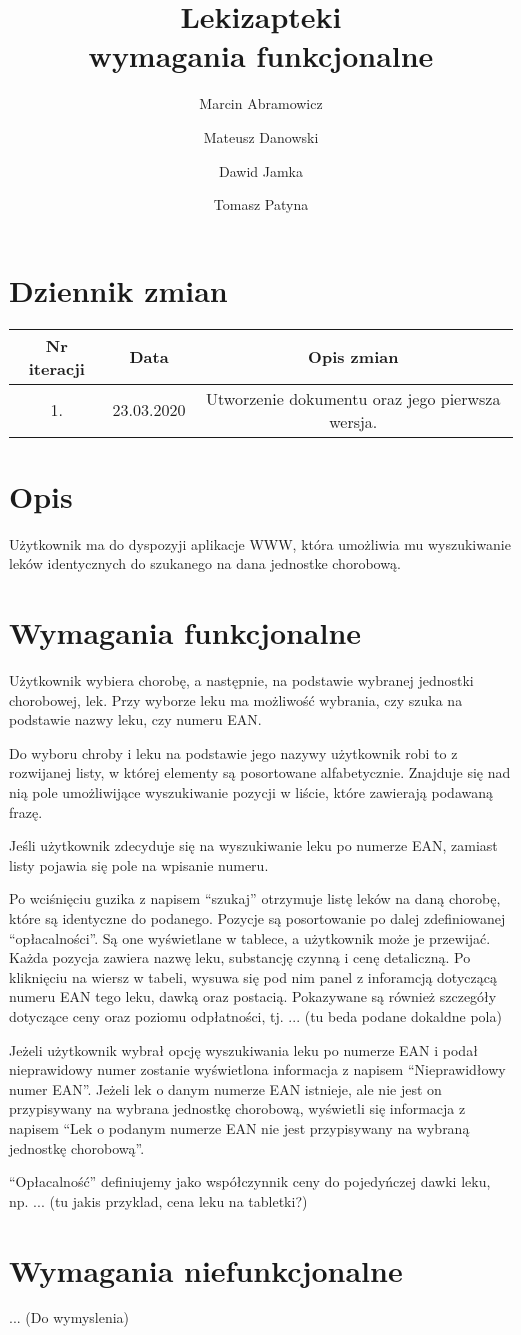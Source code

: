 \documentclass{article}
\title{
Lekizapteki\\
\large wymagania funkcjonalne}
\author{Marcin Abramowicz \and Mateusz Danowski \and Dawid Jamka \and Tomasz Patyna}
\begin{document}
  \maketitle

  \section{Dziennik zmian}
  \begin{tabular}{|c|c|c|}
    Nr iteracji & Data & Opis zmian \\
    \hline
    1. & 23.03.2020 & Utworzenie dokumentu oraz jego pierwsza wersja. \\
  \end{tabular}

  \section{Opis}
  Użytkownik ma do dyspozyji aplikacje WWW, która umożliwia mu wyszukiwanie leków identycznych do szukanego na dana jednostke chorobową.

  \section{Wymagania funkcjonalne}
  Użytkownik wybiera chorobę, a następnie, na podstawie wybranej jednostki chorobowej, lek.
  Przy wyborze leku ma możliwość wybrania, czy szuka na podstawie nazwy leku, czy numeru EAN.

  Do wyboru chroby i leku na podstawie jego nazywy użytkownik robi to z rozwijanej listy, w której elementy są posortowane alfabetycznie.
  Znajduje się nad nią pole umożliwijące wyszukiwanie pozycji w liście, które zawierają podawaną frazę.

  Jeśli użytkownik zdecyduje się na wyszukiwanie leku po numerze EAN, zamiast listy pojawia się pole na wpisanie numeru.

  Po wciśnięciu guzika z napisem ``szukaj'' otrzymuje listę leków na daną chorobę, które są identyczne do podanego.
  Pozycje są posortowanie po dalej zdefiniowanej ``opłacalności''.
  Są one wyświetlane w tablece, a użytkownik może je przewijać.
  Każda pozycja zawiera nazwę leku, substancję czynną i cenę detaliczną.
  Po kliknięciu na wiersz w tabeli, wysuwa się pod nim panel z inforamcją dotyczącą numeru EAN tego leku, dawką oraz postacią.
  Pokazywane są również szczegóły dotyczące ceny oraz poziomu odpłatności, tj. ... (tu beda podane dokaldne pola)

  Jeżeli użytkownik wybrał opcję wyszukiwania leku po numerze EAN i podał nieprawidowy numer zostanie wyświetlona informacja z napisem
  ``Nieprawidłowy numer EAN''.
  Jeżeli lek o danym numerze EAN istnieje, ale nie jest on przypisywany na wybrana jednostkę chorobową, wyświetli się informacja z napisem
  ``Lek o podanym numerze EAN nie jest przypisywany na wybraną jednostkę chorobową''.

  ``Opłacalność'' definiujemy jako współczynnik ceny do pojedyńczej dawki leku, np. ... (tu jakis przyklad, cena leku na tabletki?)

  \section{Wymagania niefunkcjonalne}

  ... (Do wymyslenia)
\end{document}
